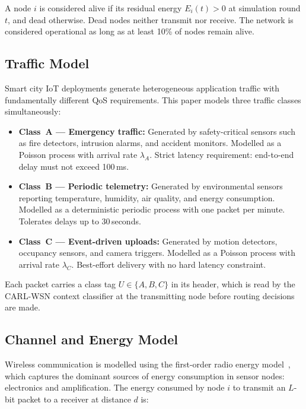 \documentclass[12pt]{article}
\begin{document}
A node $i$ is considered alive if its residual energy $E_i(t) > 0$ at
simulation round $t$, and dead otherwise. Dead nodes neither transmit
nor receive. The network is considered operational as long as at least
10\% of nodes remain alive.

\subsection{Traffic Model}\label{sec:traffic_model}

Smart city IoT deployments generate heterogeneous application traffic
with fundamentally different QoS requirements. This paper models three
traffic classes simultaneously:

\begin{itemize}
\item \textbf{Class~A --- Emergency traffic:} Generated by
safety-critical sensors such as fire detectors, intrusion alarms, and
accident monitors. Modelled as a Poisson process with arrival rate
$\lambda_A$. Strict latency requirement: end-to-end delay must not
exceed 100\,ms.

\item \textbf{Class~B --- Periodic telemetry:} Generated by
environmental sensors reporting temperature, humidity, air quality,
and energy consumption. Modelled as a deterministic periodic process
with one packet per minute. Tolerates delays up to 30\,seconds.

\item \textbf{Class~C --- Event-driven uploads:} Generated by motion
detectors, occupancy sensors, and camera triggers. Modelled as a
Poisson process with arrival rate $\lambda_C$. Best-effort delivery
with no hard latency constraint.
\end{itemize}

Each packet carries a class tag $U \in \{A, B, C\}$ in its header,
which is read by the CARL-WSN context classifier at the transmitting
node before routing decisions are made.

\subsection{Channel and Energy Model}

Wireless communication is modelled using the first-order radio energy
model~\cite{heinzelman2000}, which captures the dominant sources of
energy consumption in sensor nodes: electronics and amplification.
The energy consumed by node $i$ to transmit an $L$-bit packet to a
receiver at distance $d$ is:
\end{document}
